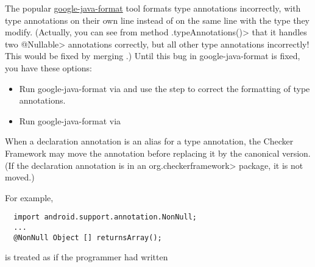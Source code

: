 The popular
\href{https://github.com/google/google-java-format}{google-java-format}
tool formats type annotations incorrectly, with type annotations on their
own line instead of on the same line with the type they modify.  (Actually,
you can see from method \<.typeAnnotations()> that
it handles two \<@Nullable> annotations correctly, but all other type
annotations incorrectly!  This would be fixed by merging
.)
Until this bug in google-java-format is fixed, you have these options:
\begin{itemize}
\item
  Run google-java-format via
   and use the
  step to correct the formatting of type annotations.
\item
  Run google-java-format via 
\end{itemize}


\label{declaration-annotations-moved} %

When a declaration annotation is an alias for a type annotation, the
Checker Framework may move the annotation before replacing it by the
canonical version. (If the declaration annotation is in an \<org.checkerframework>
package, it is not moved.)

For example,

\begin{Verbatim}
  import android.support.annotation.NonNull;
  ...
  @NonNull Object [] returnsArray();
\end{Verbatim}

\noindent
is treated as if the programmer had written

